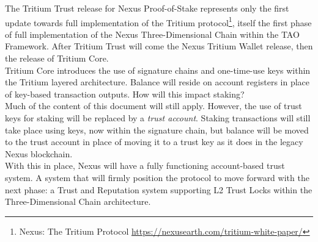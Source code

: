 \documentclass[11pt]{article}
\begin{document}
The Tritium Trust release for Nexus Proof-of-Stake represents only the first update towards full implementation of the Tritium protocol\footnote{Nexus: The Tritium Protocol \url{https://nexusearth.com/tritium-white-paper/}}, itself the first phase of full implementation of the Nexus Three-Dimensional Chain within the TAO Framework. After Tritium Trust will come the Nexus Tritium Wallet release, then the release of Tritium Core.\\

\noindent Tritium Core introduces the use of signature chains and one-time-use keys within the Tritium layered architecture. Balance will reside on account registers in place of key-based transaction outputs. How will this impact staking?\\

\noindent Much of the content of this document will still apply. However, the use of trust keys for staking will be replaced by a \textit{trust account}. Staking transactions will still take place using keys, now within the signature chain, but balance will be moved to the trust account in place of moving it to a trust key as it does in the legacy Nexus blockchain.\\

\noindent With this in place, Nexus will have a fully functioning account-based trust system. A system that will firmly position the protocol to move forward with the next phase: a Trust and Reputation system supporting L2 Trust Locks within the Three-Dimensional Chain architecture.\\
\end{document}
